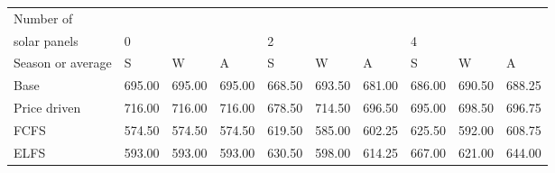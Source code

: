 \begin{table}[h] 
\centering 
\begin{tabular}{l|lll|lll|lll}Number of \\ solar panels&0& & &2& & &4& & \\ \hline 
Season or average & S & W & A & S & W & A & S & W & A \\ \hline 
Base&695.00&695.00&695.00&668.50&693.50&681.00&686.00&690.50&688.25 \\ 
Price driven&716.00&716.00&716.00&678.50&714.50&696.50&695.00&698.50&696.75 \\ 
FCFS&574.50&574.50&574.50&619.50&585.00&602.25&625.50&592.00&608.75 \\ 
ELFS&593.00&593.00&593.00&630.50&598.00&614.25&667.00&621.00&644.00 \\ 
\end{tabular} 
\end{table}
